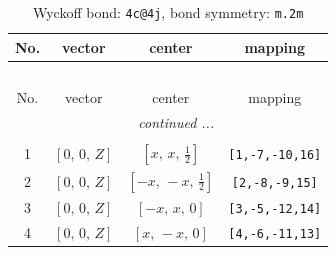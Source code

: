 \documentclass[fleqn,8pt]{jsarticle}
\begin{document}
\renewcommand{\arraystretch}{1.2}
\begin{longtable}{cccc}
\caption{Wyckoff bond: {\tt 4c@4j}, bond symmetry: {\tt m.2m}}
 \\
 \hline \hline
No. & vector & center & mapping \\ \hline \endfirsthead

\multicolumn{3}{l}{\tablename\ \thetable{}} \\
 \hline \hline
No. & vector & center & mapping \\ \hline \endhead

 \hline \hline
\multicolumn{3}{r}{\footnotesize\it continued ...} \\ \endfoot

 \hline \hline
\multicolumn{3}{r}{} \\ \endlastfoot

1 & $\left[ 0,\, 0,\, Z \right]$ & $\left[ x,\, x,\, \frac{1}{2} \right]$ & {\tt [1,-7,-10,16]} \\ \hline
2 & $\left[ 0,\, 0,\, Z \right]$ & $\left[ - x,\, - x,\, \frac{1}{2} \right]$ & {\tt [2,-8,-9,15]} \\ \hline
3 & $\left[ 0,\, 0,\, Z \right]$ & $\left[ - x,\, x,\, 0 \right]$ & {\tt [3,-5,-12,14]} \\ \hline
4 & $\left[ 0,\, 0,\, Z \right]$ & $\left[ x,\, - x,\, 0 \right]$ & {\tt [4,-6,-11,13]} \\
\end{longtable}
\renewcommand{\arraystretch}{1.2}
\end{document}
